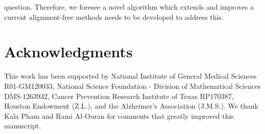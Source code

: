 \documentclass[wsdraft]{ws-procs11x85}
\begin{document}
question. 
Therefore, we foresee a novel algorithm which extends and improves a current alignment-free methods needs to be developed to address this.

\section*{Acknowledgments}
This work has been supported by National Institute of General Medical Sciences R01-GM120033, National Science Foundation - Division of Mathematical Sciences DMS-1263932, Cancer Prevention Research Institute of Texas RP170387, Houston Endowment (Z.L.), and the Alzheimer's Association (J.M.S.). 
We thank Kala Pham and Rami Al-Ouran for comments that greatly improved this manuscript.




\end{document}
